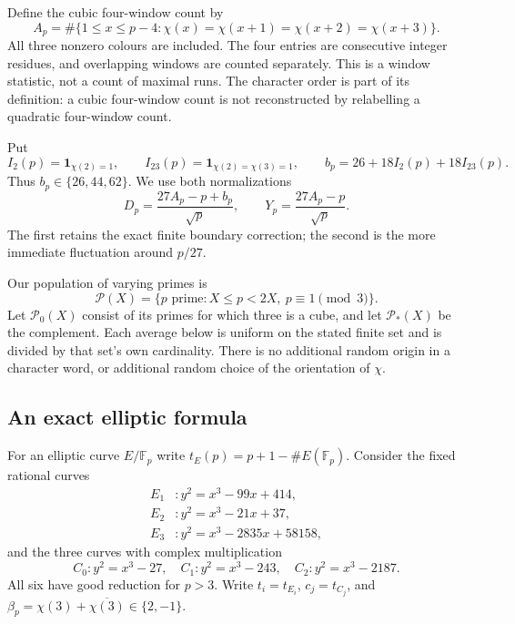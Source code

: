 \documentclass[11pt]{article}
\theoremstyle{definition}\newtheorem{definition}[theorem]{Definition}
\newcommand{\Fp}{\mathbb F_p}
\newcommand{\Pcal}{\mathcal P}
\newcommand{\ind}{\mathbf1}
\begin{document}
Define the cubic four-window count by
\begin{equation}\label{eq:count}
 A_p=\#\{1\le x\le p-4:
       \chi(x)=\chi(x+1)=\chi(x+2)=\chi(x+3)\}.
\end{equation}
All three nonzero colours are included. The four entries are consecutive
integer residues, and overlapping windows are counted separately.
This is a window statistic, not a count of maximal runs. The character
order is part of its definition: a cubic four-window count is not
reconstructed by relabelling a quadratic four-window count.

Put
\begin{equation}\label{eq:correction}
 I_2(p)=\ind_{\chi(2)=1},\qquad
 I_{23}(p)=\ind_{\chi(2)=\chi(3)=1},\qquad
 b_p=26+18I_2(p)+18I_{23}(p).
\end{equation}
Thus $b_p\in\{26,44,62\}$. We use both normalizations
\begin{equation}\label{eq:DY}
 D_p=\frac{27A_p-p+b_p}{\sqrt p},
 \qquad Y_p=\frac{27A_p-p}{\sqrt p}.
\end{equation}
The first retains the exact finite boundary correction; the second
is the more immediate fluctuation around $p/27$.

Our population of varying primes is
\[
 \Pcal(X)=\{p\text{ prime}:X\le p<2X,\ p\equiv1\pmod3\}.
\]
Let $\Pcal_0(X)$ consist of its primes for which three is a cube,
and let $\Pcal_*(X)$ be the complement. Each average below is
uniform on the stated finite set and is divided by that set's own
cardinality. There is no additional random origin in a character
word, or additional random choice of the orientation of $\chi$.

\subsection{An exact elliptic formula}
For an elliptic curve $E/\Fp$ write
$t_E(p)=p+1-\#E(\Fp)$. Consider the fixed rational curves
\begin{align}
 E_1&:y^2=x^3-99x+414,\nonumber\\
 E_2&:y^2=x^3-21x+37,\label{eq:noncm}\\
 E_3&:y^2=x^3-2835x+58158,\nonumber
\end{align}
and the three curves with complex multiplication
\begin{equation}\label{eq:cmcurves}
 C_0:y^2=x^3-27,\quad
 C_1:y^2=x^3-243,\quad
 C_2:y^2=x^3-2187.
\end{equation}
All six have good reduction for $p>3$. Write $t_i=t_{E_i}$,
$c_j=t_{C_j}$, and
$\beta_p=\chi(3)+\overline{\chi(3)}\in\{2,-1\}$.
\end{document}
